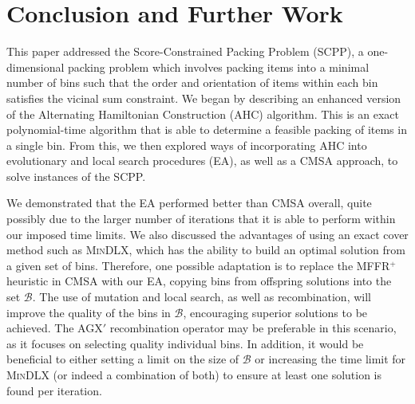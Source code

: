 \documentclass[a4paper,11pt,authoryear]{elsarticle}
\begin{document}
\section{Conclusion and Further Work}
\label{sec:conclusion}
\noindent This paper addressed the Score-Constrained Packing Problem (SCPP), a one-dimensional packing problem which involves packing items into a minimal number of bins such that the order and orientation of items within each bin satisfies the vicinal sum constraint. We began by describing an enhanced version of the Alternating Hamiltonian Construction (AHC) algorithm. This is an exact polynomial-time algorithm that is able to determine a feasible packing of items in a single bin. From this, we then explored ways of incorporating AHC into evolutionary and local search procedures (EA), as well as a CMSA approach, to solve instances of the SCPP.

We demonstrated that the EA performed better than CMSA overall, quite possibly due to the larger number of iterations that it is able to perform within our imposed time limits. We also discussed the advantages of using an exact cover method such as \textsc{MinDLX}, which has the ability to build an optimal solution from a given set of bins. Therefore, one possible adaptation is to replace the MFFR$^+$ heuristic in CMSA with our EA, copying bins from offspring solutions into the set $\mathcal{B}$. The use of mutation and local search, as well as recombination, will improve the quality of the bins in $\mathcal{B}$, encouraging superior solutions to be achieved. The AGX$'$ recombination operator may be preferable in this scenario, as it focuses on selecting quality individual bins. In addition, it would be beneficial to either setting a limit on the size of $\mathcal{B}$ or increasing the time limit for \textsc{MinDLX} (or indeed a combination of both) to ensure at least one solution is found per iteration.
\end{document}
